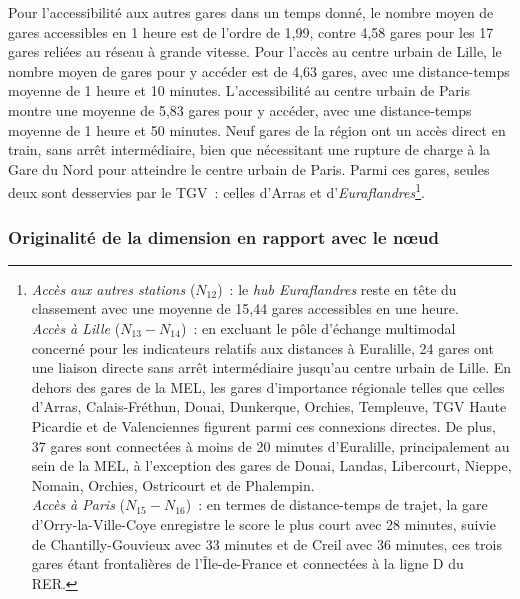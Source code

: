 \begin{refsegment}
Pour l'accessibilité aux autres gares dans un temps donné, le nombre moyen de gares accessibles en 1 heure est de l'ordre de 1,99, contre 4,58 gares pour les 17 gares reliées au réseau à grande vitesse. Pour l'accès au centre urbain de Lille, le nombre moyen de gares pour y accéder est de 4,63 gares, avec une distance-temps moyenne de 1 heure et 10 minutes. L'accessibilité au centre urbain de Paris montre une moyenne de 5,83 gares pour y accéder, avec une distance-temps moyenne de 1 heure et 50 minutes. Neuf gares de la région ont un accès direct en train, sans arrêt intermédiaire, bien que nécessitant une rupture de charge à la Gare du Nord pour atteindre le centre urbain de Paris. Parmi ces gares, seules deux sont desservies par le \acrshort{TGV}~: celles d'Arras et d'\textsl{Euraflandres}\footnote{
    \textsl{Accès aux autres stations} (\(N_{12}\))~: le \textsl{hub Euraflandres} reste en tête du classement avec une moyenne de 15,44 gares accessibles en une heure.
    \\
    \textsl{Accès à Lille} (\(N_{13} - N_{14}\))~: en excluant le pôle d'échange multimodal concerné pour les indicateurs relatifs aux distances à Euralille, 24 gares ont une liaison directe sans arrêt intermédiaire jusqu'au centre urbain de Lille. En dehors des gares de la \acrfull{MEL}, les gares d'importance régionale telles que celles d'Arras, Calais-Fréthun, Douai, Dunkerque, Orchies, Templeuve, TGV Haute Picardie et de Valenciennes figurent parmi ces connexions directes. De plus, 37 gares sont connectées à moins de 20 minutes d'Euralille, principalement au sein de la \acrshort{MEL}, à l'exception des gares de Douai, Landas, Libercourt, Nieppe, Nomain, Orchies, Ostricourt et de Phalempin.
    \\
    \textsl{Accès à Paris} (\(N_{15} - N_{16}\))~: en termes de distance-temps de trajet, la gare d'Orry-la-Ville-Coye enregistre le score le plus court avec 28 minutes, suivie de Chantilly-Gouvieux avec 33 minutes et de Creil avec 36 minutes, ces trois gares étant frontalières de l'Île-de-France et connectées à la ligne D du \acrfull{RER}.
}.%

\subsubsection*{Originalité de la dimension en rapport avec le nœud
    \label{chap6:indicateurs-node-originalite}
    }


\end{refsegment}
